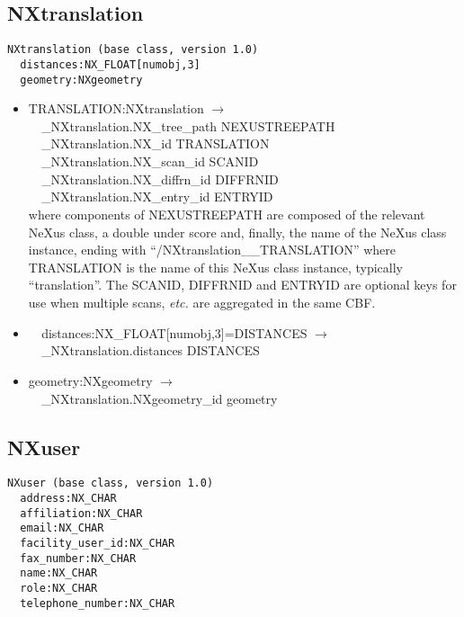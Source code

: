 \documentclass[11pt]{article}
\begin{document}
{{\subsection{NXtranslation}

\begin{verbatim}
NXtranslation (base class, version 1.0)
  distances:NX_FLOAT[numobj,3]
  geometry:NXgeometry
\end{verbatim}

\begin{itemize}

\item{TRANSLATION:NXtranslation $\rightarrow$\\
\verb|  |\_NXtranslation.NX\_tree\_path    NEXUSTREEPATH \\
\verb|  |\_NXtranslation.NX\_id            TRANSLATION \\
\verb|  |\_NXtranslation.NX\_scan\_id      SCANID \\
\verb|  |\_NXtranslation.NX\_diffrn\_id    DIFFRNID \\
\verb|  |\_NXtranslation.NX\_entry\_id     ENTRYID \\
where components of NEXUSTREEPATH are composed of the
relevant NeXus class, a double under score and, finally, the
name of the NeXus class instance, ending with ``/NXtranslation\_\_TRANSLATION''
where TRANSLATION is the name of this NeXus class instance, typically ``translation''.
The SCANID, DIFFRNID and ENTRYID are optional keys for use
when multiple scans, {\it etc.} are aggregated in the same CBF.}

\item{\verb|  |distances:NX\_FLOAT[numobj,3]=DISTANCES $\rightarrow$\\
\verb|  |\_NXtranslation.distances DISTANCES}

\item{geometry:NXgeometry $\rightarrow$\\
\verb|  |\_NXtranslation.NXgeometry\_id geometry}
\end{itemize}
\subsection{NXuser}

\begin{verbatim}
NXuser (base class, version 1.0)
  address:NX_CHAR
  affiliation:NX_CHAR
  email:NX_CHAR
  facility_user_id:NX_CHAR
  fax_number:NX_CHAR
  name:NX_CHAR
  role:NX_CHAR
  telephone_number:NX_CHAR
\end{verbatim}

}}
\end{document}
